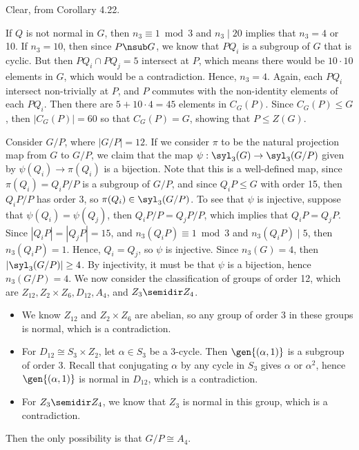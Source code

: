\begin{solalph}
    \item Clear, from Corollary 4.22.
    \item If $Q$ is not normal in $G$, then $n_3 \equiv 1 \bmod 3$ and $n_3 \mid 20$ implies that $n_3 = 4$ or 10. If $n_3 = 10$, then since $P \nsub G$, we know that $PQ_i$ is a subgroup of $G$ that is cyclic. But then $PQ_i \cap PQ_j = 5$ intersect at $P$, which means there would be $10 \cdot 10$ elements in $G$, which would be a contradiction. Hence, $n_3 = 4$. Again, each $PQ_i$ intersect non-trivially at $P$, and $P$ commutes with the non-identity elements of each $PQ_i$. Then there are $5 + 10 \cdot 4 = 45$ elements in $C_G(P)$. Since $C_G(P) \leq G$, then $|C_G(P)| = 60$ so that $C_G(P) = G$, showing that $P \leq Z(G)$.
    
    Consider $G/P$, where $|G/P| = 12$. If we consider $\pi$ to be the natural projection map from $G$ to $G/P$, we claim that the map $\psi : \syl_3(G) \to \syl_3(G/P)$ given by $\psi(Q_i) \to \pi(Q_i)$ is a bijection. Note that this is a well-defined map, since $\pi(Q_i) = Q_iP/P$ is a subgroup of $G/P$, and since $Q_iP \leq G$ with order 15, then $Q_iP/P$ has order 3, so $\pi(Q_i) \in \syl_3(G/P)$. To see that $\psi$ is injective, suppose that $\psi(Q_i) = \psi(Q_j)$, then $Q_iP/P = Q_jP/P$, which implies that $Q_iP = Q_jP$. Since $|Q_iP| = |Q_jP| = 15$, and $n_3(Q_iP) \equiv 1 \bmod 3$ and $n_3(Q_iP) \mid 5$, then $n_3(Q_iP) = 1$. Hence, $Q_i = Q_j$, so $\psi$ is injective. Since $n_3(G) = 4$, then $|\syl_3(G/P)| \geq 4$. By injectivity, it must be that $\psi$ is a bijection, hence $n_3(G/P) = 4$. We now consider the classification of groups of order 12, which are $Z_{12}, Z_2 \times Z_6, D_{12}, A_4$, and $Z_3 \semidir Z_4$.
    \begin{itemize}
        \item We know $Z_{12}$ and $Z_2 \times Z_6$ are abelian, so any group of order 3 in these groups is normal, which is a contradiction.
        \item For $D_{12} \cong S_3 \times Z_2$, let $\alpha \in S_3$ be a 3-cycle. Then $\gen{(\alpha, 1)}$ is a subgroup of order 3. Recall that conjugating $\alpha$ by any cycle in $S_3$ gives $\alpha$ or $\alpha^2$, hence $\gen{(\alpha, 1)}$ is normal in $D_{12}$, which is a contradiction.
        \item For $Z_3 \semidir Z_4$, we know that $Z_3$ is normal in this group, which is a contradiction.
    \end{itemize}
    Then the only possibility is that $G/P \cong A_4$.


\end{solalph}
